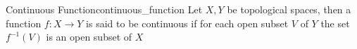 \begin{definition}{Continuous Function}{continuous_function}
Let \( X, Y\) be topological spaces, then a function \( f : X \to Y  \) is said
to be continuous if for each open subset \( V \) of \( Y \) the set \( f ^{-1}
\left( V \right)  \) is an open subset of \( X \) 
\end{definition}
